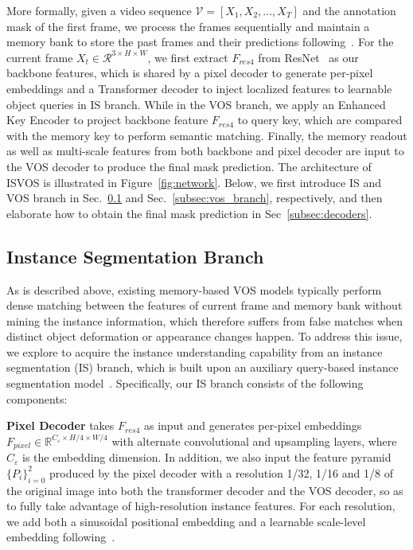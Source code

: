 \documentclass[10pt,twocolumn,letterpaper]{article}
\newcommand{\system}{ISVOS\xspace}
\begin{document}
More formally, given a video sequence $\mathcal{V} = [\textit{X}_{1}, \textit{X}_{2}, ..., \textit{X}_{T}]$ and the annotation mask of the first frame, we process the frames sequentially and maintain a memory bank to store the past frames and their predictions following~\cite{oh2019video,cheng2021stcn}. For the current frame $\textit{X}_{t} \in \mathcal{R}^{3 \times H \times W}$, we first extract $F_{res4}$ from ResNet~\cite{he2016deep} as our backbone features, which is shared by a pixel decoder to generate per-pixel embeddings and a Transformer decoder to inject localized features to learnable object queries in IS branch. While in the VOS branch, we apply an Enhanced Key Encoder to project backbone feature $F_{res4}$ to query key, which are compared with the memory key to perform semantic matching. Finally, the memory readout as well as multi-scale features from both backbone and pixel decoder are input to the VOS decoder to produce the final mask prediction. The architecture of \system is illustrated in Figure~\ref{fig:network}. Below, we first introduce IS and VOS branch in Sec.~\ref{subsec:is_branch} and Sec.~\ref{subsec:vos_branch}, respectively, and then elaborate how to obtain the final mask prediction in Sec~\ref{subsec:decoders}.


\subsection{Instance Segmentation Branch}
\label{subsec:is_branch}
As is described above, existing memory-based VOS models typically perform dense matching between the features of current frame and memory bank without mining the instance information, which therefore suffers from false matches when distinct object deformation or appearance changes happen. To address this issue, we explore to acquire the instance understanding capability from an instance segmentation (IS) branch, which is built upon an auxiliary query-based instance segmentation model~\cite{cheng2022masked}. Specifically, our IS branch consists of the following components: 

\vspace{0.02in}
\noindent \textbf{Pixel Decoder} takes $F_{res4}$ as input and generates per-pixel embeddings $F_{pixel} \in \mathbb{R}^{C_{\varepsilon} \times H/4 \times W/4}$ with alternate convolutional and upsampling layers, where $C_{\varepsilon}$ is the embedding dimension. In addition, we also input the feature pyramid $\{P_{i}\}_{i=0}^{2}$ produced by the pixel decoder with a resolution 1/32, 1/16 and 1/8 of the original image into both the transformer decoder and the VOS decoder, so as to fully take advantage of high-resolution instance features. For each resolution, we add both a sinusoidal positional embedding and a learnable scale-level embedding following~\cite{zhu2021deformable,cheng2022masked}.
\end{document}
